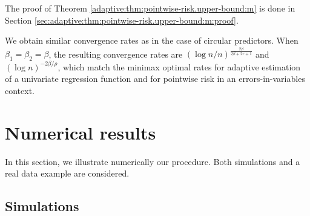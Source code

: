 \documentclass[11pt,a4paper,openany]{article}
\newtheorem{remark}[thm]{Remark}
\begin{document}
The proof of Theorem \ref{adaptive:thm:pointwise-risk.upper-bound:m} is done in Section \ref{sec:adaptive:thm:pointwise-risk.upper-bound:m:proof}.


We obtain similar convergence rates as in the case of circular predictors. %
When $\beta_1 = \beta_2 = \beta$, the resulting convergence rates are $\left(\log n / n\right)^{\frac{2\beta}{2\beta + 2r + 1}}$ and $\left(\log n\right)^{-2\beta / \rho}$, which match the minimax optimal rates for adaptive estimation of a univariate regression function and for pointwise risk in an errors-in-variables context. %




\section{Numerical results}\label{numerical-results}
In this section, we illustrate numerically our procedure. Both simulations and a real data example are considered.

\subsection{Simulations}
\end{document}
